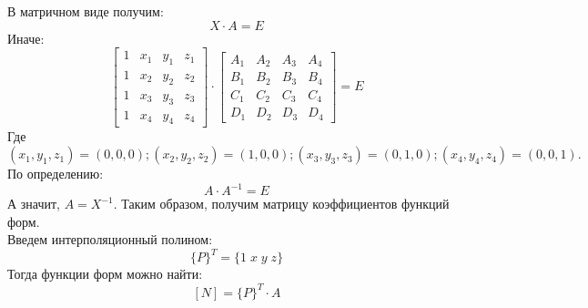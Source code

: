 \documentclass[12pt]{article}
\begin{document}
В матричном виде получим:\\
\[X \cdot A = E\]
Иначе:\\
\[\begin{bmatrix}
1& x_1& y_1& z_1\\
1& x_2& y_2& z_2\\
1& x_3& y_3& z_3\\
1& x_4& y_4& z_4
\end{bmatrix} \cdot
\begin{bmatrix}
A_1& A_2& A_3& A_4\\
B_1& B_2& B_3& B_4\\
C_1& C_2& C_3& C_4\\
D_1& D_2& D_3& D_4
\end{bmatrix} = E\]
Где $(x_1, y_1, z_1) = (0,0,0); (x_2, y_2, z_2) = (1,0,0); (x_3, y_3, z_3) = (0,1,0); (x_4, y_4, z_4) = (0,0,1).$\\
По определению:\\
\[A \cdot A^{-1} = E\]
А значит, $A = X^{-1}.$ Таким образом, получим матрицу коэффициентов функций форм.\\
Введем интерполяционный полином:\\
\[\{P\}^T = \{1 \; x \; y \; z\}\]
Тогда функции форм можно найти:\\
\[[N] = \{P\}^T \cdot A\]
\end{document}
